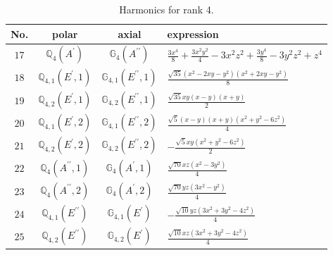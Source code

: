 \documentclass[fleqn,8pt,landscape]{jsarticle}
\begin{document}
\begin{table}[ht!]
\begin{center}
\caption{Harmonics for rank 4.}
\renewcommand{\arraystretch}{1.3}
\begin{tabular}{cccl} \hline \hline
No. & polar & axial & expression \\ \hline
$ 17 $ & $ \mathbb{Q}_{4}(A^{\prime}) $ & $ \mathbb{G}_{4}(A^{\prime\prime}) $ & $ \frac{3 x^{4}}{8} + \frac{3 x^{2} y^{2}}{4} - 3 x^{2} z^{2} + \frac{3 y^{4}}{8} - 3 y^{2} z^{2} + z^{4} $ \\
$ 18 $ & $ \mathbb{Q}_{4,1}(E^{\prime},1) $ & $ \mathbb{G}_{4,1}(E^{\prime\prime},1) $ & $ \frac{\sqrt{35} \left(x^{2} - 2 x y - y^{2}\right) \left(x^{2} + 2 x y - y^{2}\right)}{8} $ \\
$ 19 $ & $ \mathbb{Q}_{4,2}(E^{\prime},1) $ & $ \mathbb{G}_{4,2}(E^{\prime\prime},1) $ & $ \frac{\sqrt{35} x y \left(x - y\right) \left(x + y\right)}{2} $ \\
$ 20 $ & $ \mathbb{Q}_{4,1}(E^{\prime},2) $ & $ \mathbb{G}_{4,1}(E^{\prime\prime},2) $ & $ \frac{\sqrt{5} \left(x - y\right) \left(x + y\right) \left(x^{2} + y^{2} - 6 z^{2}\right)}{4} $ \\
$ 21 $ & $ \mathbb{Q}_{4,2}(E^{\prime},2) $ & $ \mathbb{G}_{4,2}(E^{\prime\prime},2) $ & $ - \frac{\sqrt{5} x y \left(x^{2} + y^{2} - 6 z^{2}\right)}{2} $ \\
$ 22 $ & $ \mathbb{Q}_{4}(A^{\prime\prime},1) $ & $ \mathbb{G}_{4}(A^{\prime},1) $ & $ \frac{\sqrt{70} x z \left(x^{2} - 3 y^{2}\right)}{4} $ \\
$ 23 $ & $ \mathbb{Q}_{4}(A^{\prime\prime},2) $ & $ \mathbb{G}_{4}(A^{\prime},2) $ & $ \frac{\sqrt{70} y z \left(3 x^{2} - y^{2}\right)}{4} $ \\
$ 24 $ & $ \mathbb{Q}_{4,1}(E^{\prime\prime}) $ & $ \mathbb{G}_{4,1}(E^{\prime}) $ & $ - \frac{\sqrt{10} y z \left(3 x^{2} + 3 y^{2} - 4 z^{2}\right)}{4} $ \\
$ 25 $ & $ \mathbb{Q}_{4,2}(E^{\prime\prime}) $ & $ \mathbb{G}_{4,2}(E^{\prime}) $ & $ \frac{\sqrt{10} x z \left(3 x^{2} + 3 y^{2} - 4 z^{2}\right)}{4} $ \\
 \hline \hline
\end{tabular}
\end{center}
\end{table}
\end{document}
